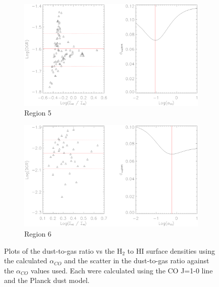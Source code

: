 \begin{figure}
  \ContinuedFloat
  \begin{subfigure}[t]{1\textwidth}
    \centering
    \includegraphics[width=1.\textwidth]{dgr_imgs/region_5_aco_output_10.eps}
    \caption{Region 5}
  \end{subfigure}

  \begin{subfigure}[t]{1\textwidth}
    \centering
    \includegraphics[width=1.\textwidth]{dgr_imgs/region_6_aco_output_10.eps}
    \caption{Region 6}
  \end{subfigure}
   \caption[Dust-to-Gas Ratio Determination Plots for CO J=1-0]{Plots of the dust-to-gas ratio vs the H$_2$ to HI surface densities using the calculated $\alpha_{CO}$ and the scatter in the dust-to-gas ratio against the $\alpha_{CO}$ values used.  Each were calculated using the CO J=1-0 line and the Planck dust model.}
   \label{fig:dgr_co10}
\end{figure}


